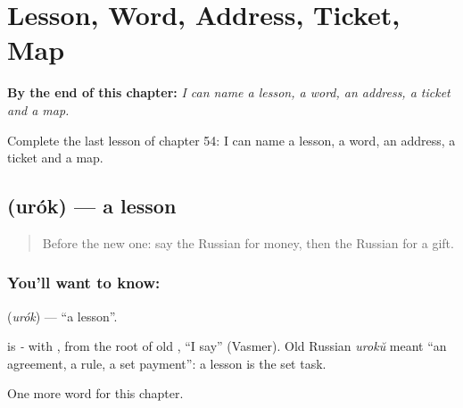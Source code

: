 
\chapter{Lesson, Word, Address, Ticket, Map}
\label{ch:ru-lesson-word-address-ticket-map}

\begin{chapteropening}
\textbf{By the end of this chapter:} \emph{I can name a lesson, a word, an address, a ticket and a map.}

Complete the last lesson of chapter 54: I can name a lesson, a word, an address, a ticket and a map.
\end{chapteropening}

\section[\texorpdfstring{\ru{урок} (urók)}{урок (urók)}]{ (urók) — a lesson}

\label{lesson:RU-C54-lesson}



\begin{quote}
Before the new one: say the Russian for money, then the Russian for a gift.
\end{quote}

\subsection*{You'll want to know: }
\textbf{} (\emph{urók}) — \textquotedblleft{}a lesson\textquotedblright{}.

\begin{cousinweb}
\textbf{} is \emph{-} with \emph{}, from the root of old \emph{}, \textquotedblleft{}I say\textquotedblright{} (Vasmer). Old Russian \emph{urokŭ} meant \textquotedblleft{}an agreement, a rule, a set payment\textquotedblright{}: a lesson is the set task.
\end{cousinweb}

\begin{grammarlens}[title={What you've built}]
One more word for this chapter.
\end{grammarlens}

